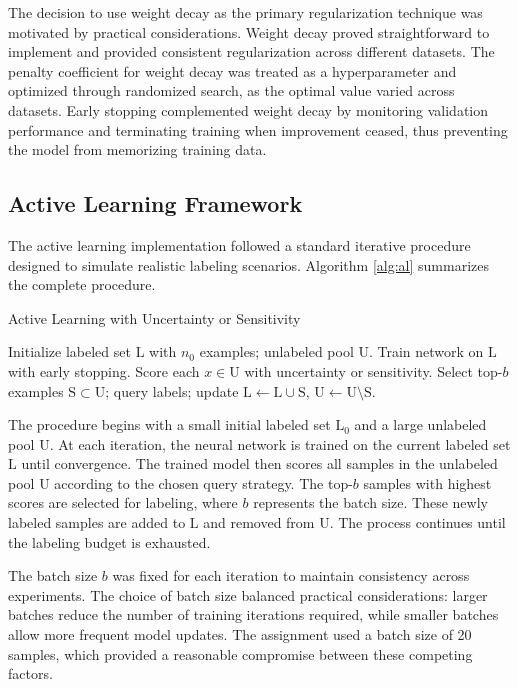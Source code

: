 \documentclass[conference]{IEEEtran}
\newcommand{\set}[1]{\mathrm{#1}}  %
\begin{document}
The decision to use weight decay as the primary regularization technique was motivated by practical considerations. Weight decay proved straightforward to implement and provided consistent regularization across different datasets. The penalty coefficient for weight decay was treated as a hyperparameter and optimized through randomized search, as the optimal value varied across datasets. Early stopping complemented weight decay by monitoring validation performance and terminating training when improvement ceased, thus preventing the model from memorizing training data.

\subsection{Active Learning Framework}

The active learning implementation followed a standard iterative procedure designed to simulate realistic labeling scenarios. Algorithm \ref{alg:al} summarizes the complete procedure.

\begin{algorithm}[t]
\caption{Active Learning with Uncertainty or Sensitivity}
\label{alg:al}
\begin{algorithmic}[1]
\State Initialize labeled set $\set{L}$ with $n_0$ examples; unlabeled pool $\set{U}$.
  \State Train network on $\set{L}$ with early stopping.
  \State Score each $x\in \set{U}$ with uncertainty or sensitivity.
  \State Select top-$b$ examples $\set{S}\subset \set{U}$; query labels; update $\set{L}\leftarrow \set{L}\cup \set{S}$, $\set{U}\leftarrow \set{U}\setminus \set{S}$.
\EndWhile
\end{algorithmic}
\end{algorithm}

The procedure begins with a small initial labeled set $\set{L}_0$ and a large unlabeled pool $\set{U}$. At each iteration, the neural network is trained on the current labeled set $\set{L}$ until convergence. The trained model then scores all samples in the unlabeled pool $\set{U}$ according to the chosen query strategy. The top-$b$ samples with highest scores are selected for labeling, where $b$ represents the batch size. These newly labeled samples are added to $\set{L}$ and removed from $\set{U}$. The process continues until the labeling budget is exhausted.

The batch size $b$ was fixed for each iteration to maintain consistency across experiments. The choice of batch size balanced practical considerations: larger batches reduce the number of training iterations required, while smaller batches allow more frequent model updates. The assignment used a batch size of 20 samples, which provided a reasonable compromise between these competing factors.
\end{document}
